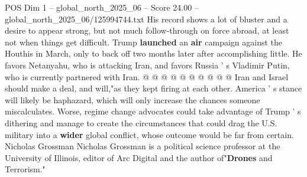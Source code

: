 \begin{textsample}{POS Dim 1 – global\_north\_2025\_06 – Score 24.00 – global\_north\_2025\_06/125994744.txt}
His record shows a lot of bluster and a desire to appear strong, but not much follow-through on force abroad, at least not when things get difficult.
Trump \textbf{launched} an \textbf{air} campaign against the Houthis in March, only to back off two months later after accomplishing little.
He favors Netanyahu, who is attacking Iran, and favors Russia ' s Vladimir Putin, who is currently partnered with Iran. @ @ @ @ @ @ @ @ @ @ Iran and Israel should make a deal, and will,"as they kept firing at each other.
America ' s stance will likely be haphazard, which will only increase the chances someone miscalculates.
Worse, regime change advocates could take advantage of Trump ' s dithering and manage to create the circumstances that could drag the U.S. military into a \textbf{wider} global conflict, whose outcome would be far from certain.
Nicholas Grossman Nicholas Grossman is a political science professor at the University of Illinois, editor of Arc Digital and the author of"\textbf{Drones} and Terrorism."

\end{textsample}
